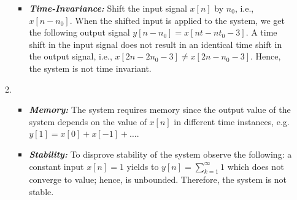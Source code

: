 \documentclass[10pt,a4paper, margin=1in]{article}
\begin{document}
\begin{enumerate}
\begin{enumerate}
\begin{itemize}
		\item \textbf{\textit{Time-Invariance:}} Shift the input signal $x[n]$ by $n_0$, i.e., $x[n-n_0]$. When the shifted input is applied to the system, we get the following output signal $y[n-n_0]  = x[nt-nt_0-3]$. A time shift in the input signal does not result in an identical time shift in the output signal, i.e., $x[2n-2n_0-3] \neq x[2n - n_0 - 3]$. Hence, the system is not time invariant.
	\end{itemize}
    \item %
	\begin{itemize}
		\item \textbf{\textit{Memory:}} The system requires memory since the output value of the system depends on the value of $x[n]$ in different time instances, e.g. $y[1] = x[0] + x[-1] + \ldots$.
		\item \textbf{\textit{Stability:}} 
			To disprove stability of the system observe the following: a constant input $x[n]=1$ yields to $y[n]=\sum_{k=1}^{\infty} 1$ which does not converge to value; hence, is unbounded. Therefore, the system is not stable.	
		
		
		

\end{itemize}
\end{enumerate}
\end{enumerate}
\end{document}

